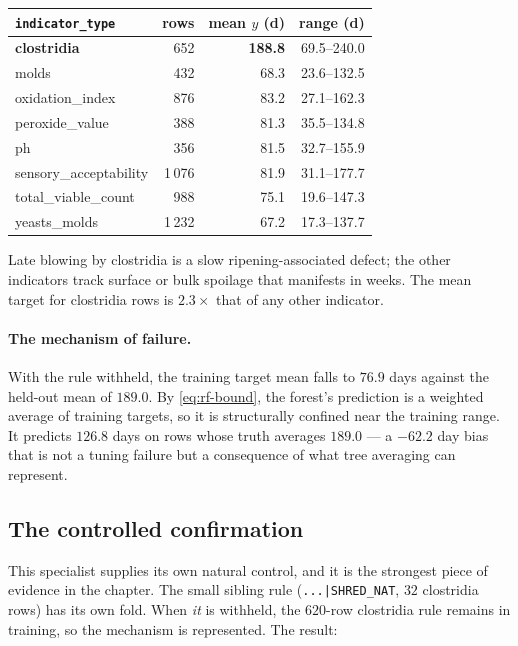 \begin{center}\small
\begin{tabular}{lrrr}
\toprule
\texttt{indicator\_type} & rows & mean $y$ (d) & range (d) \\
\midrule
\textbf{clostridia} & 652 & \textbf{188.8} & 69.5--240.0 \\
molds & 432 & 68.3 & 23.6--132.5 \\
oxidation\_index & 876 & 83.2 & 27.1--162.3 \\
peroxide\_value & 388 & 81.3 & 35.5--134.8 \\
ph & 356 & 81.5 & 32.7--155.9 \\
sensory\_acceptability & 1\,076 & 81.9 & 31.1--177.7 \\
total\_viable\_count & 988 & 75.1 & 19.6--147.3 \\
yeasts\_molds & 1\,232 & 67.2 & 17.3--137.7 \\
\bottomrule
\end{tabular}
\end{center}

Late blowing by clostridia is a slow ripening-associated defect; the other
indicators track surface or bulk spoilage that manifests in weeks. The
mean target for clostridia rows is $2.3\times$ that of any other indicator.

\paragraph{The mechanism of failure.} With the rule withheld, the training
target mean falls to $76.9$ days against the held-out mean of $189.0$. By
\cref{eq:rf-bound}, the forest's prediction is a weighted average of
training targets, so it is structurally confined near the training range.
It predicts $126.8$ days on rows whose truth averages $189.0$ --- a
$-62.2$ day bias that is not a tuning failure but a consequence of what
tree averaging can represent.

\subsection{The controlled confirmation}

This specialist supplies its own natural control, and it is the strongest
piece of evidence in the chapter. The small sibling rule
(\texttt{...|SHRED\_NAT}, $32$ clostridia rows) has its own fold. When
\emph{it} is withheld, the $620$-row clostridia rule remains in training,
so the mechanism is represented. The result:

